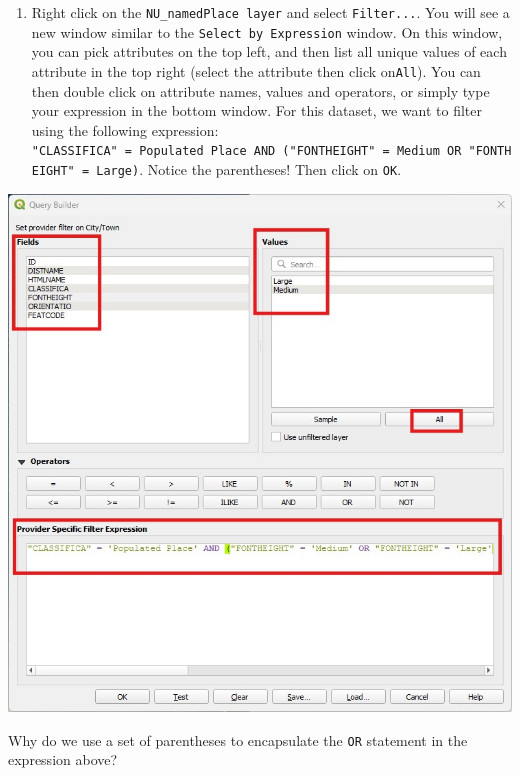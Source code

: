 \documentclass[
  letterpaper,
  DIV=11,
  numbers=noendperiod]{scrreprt}
\providecommand{\tightlist}{%
  \setlength{\itemsep}{0pt}\setlength{\parskip}{0pt}}\usepackage{longtable,booktabs,array}
\begin{document}
\begin{enumerate}
\def\labelenumi{(\arabic{enumi})}
\setcounter{enumi}{231}
\tightlist
\item
  Right click on the \texttt{NU\_namedPlace\ layer} and select
  \texttt{Filter...}. You will see a new window similar to the
  \texttt{Select\ by\ Expression} window. On this window, you can pick
  attributes on the top left, and then list all unique values of each
  attribute in the top right (select the attribute then click
  on\texttt{All}). You can then double click on attribute names, values
  and operators, or simply type your expression in the bottom window.
  For this dataset, we want to filter using the following expression:
  \texttt{"CLASSIFICA"\ =\ \textquotesingle{}Populated\ Place\textquotesingle{}\ AND\ ("FONTHEIGHT"\ =\ \textquotesingle{}Medium\textquotesingle{}\ OR\ "FONTHEIGHT"\ =\ \textquotesingle{}Large\textquotesingle{})}.
  Notice the parentheses! Then click on \texttt{OK}.
\end{enumerate}

\includegraphics{images/lab_8/lab8_fig6_filtering.jpg}

\begin{tcolorbox}[enhanced jigsaw, coltitle=black, toprule=.15mm, breakable, opacitybacktitle=0.6, left=2mm, colback=white, leftrule=.75mm, rightrule=.15mm, colbacktitle=quarto-callout-important-color!10!white, toptitle=1mm, titlerule=0mm, colframe=quarto-callout-important-color-frame, arc=.35mm, bottomtitle=1mm, opacityback=0, bottomrule=.15mm, title=\textcolor{quarto-callout-important-color}{\faExclamation}\hspace{0.5em}{Stop and Think}]

Why do we use a set of parentheses to encapsulate the \texttt{OR}
statement in the expression above?

\end{tcolorbox}
\end{document}
